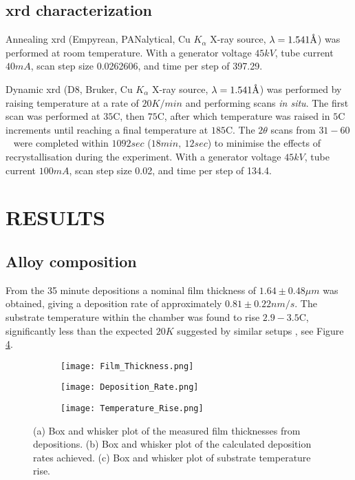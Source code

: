 \documentclass[a4paper,12pt,oneside]{article}%
\begin{document}
\subsection{\acrshort{xrd} characterization}
Annealing \acrshort{xrd} (Empyrean, PANalytical, Cu $K_{\alpha}$ X-ray source, $\lambda = 1.541 \mbox{\normalfont\AA}$) was performed at room temperature. 
With a generator voltage $45 kV$, tube current $40 mA$, scan step size 0.0262606, and time per step of 397.29. 

Dynamic \acrshort{xrd} (D8, Bruker, Cu $K_{\alpha}$ X-ray source, $\lambda = 1.541 \mbox{\normalfont\AA}$) was performed by raising temperature at a rate of $20 K/min$ and performing scans \textit{in situ}. The first scan was performed at $35$\degree C, then $75$\degree C, after which temperature was raised in $5$\degree C increments until reaching a final temperature at $185$\degree C. The $2 \theta$ scans from $31 - 60$\degree~ were completed within $1092 sec$ ($18min,~ 12sec$) to minimise the effects of recrystallisation during the experiment.
With a generator voltage $45 kV$, tube current $100 mA$, scan step size 0.02, and time per step of 134.4. 


\section{RESULTS}
\subsection{Alloy composition}

From the 35 minute depositions a nominal film thickness of $1.64 \pm 0.48 \mu m$ was obtained, giving a deposition rate of approximately $0.81 \pm 0.22 nm/s$. The substrate temperature within the chamber was found to rise $2.9 - 3.5$\degree C, significantly less than the expected $20K$ suggested by similar setups \cite{Wang2014}, see Figure \ref{fig:Film_Thickness_DepRate}.

\begin{figure}[h]
	\centering
	\begin{subfigure}[htbp]{0.32\textwidth}
		\texttt{[image: Film\_Thickness.png]}
		\caption{}
		\label{fig:Film_Thickness}
	\end{subfigure}
	\begin{subfigure}[htbp]{0.32\textwidth}
		\texttt{[image: Deposition\_Rate.png]}
		\caption{}
		\label{fig:Deposition_Rate}
	\end{subfigure}
\begin{subfigure}[htbp]{0.32\textwidth}
	\texttt{[image: Temperature\_Rise.png]}
	\caption{}
	\label{fig:Temperature_Rise}
\end{subfigure}
	\caption{(a) Box and whisker plot of the measured film thicknesses from depositions. (b) Box and whisker plot of the calculated deposition rates achieved. (c) Box and whisker plot of substrate temperature rise.}%
	\label{fig:Film_Thickness_DepRate}
\end{figure}
\end{document}

